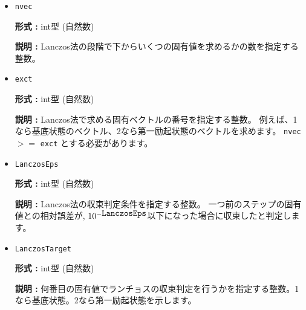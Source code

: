 \begin{itemize}
{\bf 形式 :} int型 (整数)

{\bf 説明 :} 
\begin{itemize}
\item{ランチョス法}
\begin{itemize}
\item{カノニカル集団かつ \verb|initial_iv| $\geq 0$の場合}

ノンゼロの成分が指定されます。

\item{ \verb|initial_iv| $< 0$の場合}

乱数のシードが指定され、全ての成分に対して係数がランダムに与えられます。なお、グランドカノニカルの場合は初期状態として多くの状態を持つよう、こちらの様式が適用されます。
\end{itemize}

\item{TPQ法}

乱数のシードが指定され、全ての成分に対して係数がランダムに与えられます。
\end{itemize}
初期ベクトル設定の詳細については、\ref{Ch:algorithm}を参照ください。
 
 \item  \verb|nvec|

{\bf 形式 :} int型 (自然数)

{\bf 説明 :} Lanczos法の段階で下からいくつの固有値を求めるかの数を指定する整数。

 \item  \verb|exct|

{\bf 形式 :} int型 (自然数)

{\bf 説明 :} Lanczos法で求める固有ベクトルの番号を指定する整数。
例えば、1なら基底状態のベクトル、2なら第一励起状態のベクトルを求めます。
   \verb|nvec| $>=$ \verb|exct| とする必要があります。

\item   \verb|LanczosEps|
   
{\bf 形式 :} int型 (自然数)

{\bf 説明 :} Lanczos法の収束判定条件を指定する整数。
一つ前のステップの固有値との相対誤差が, $10^{- \verb|LanczosEps|}$以下になった場合に収束したと判定します。

 \item  \verb|LanczosTarget| 
   
 {\bf 形式 :} int型 (自然数)

  {\bf 説明 :} 何番目の固有値でランチョスの収束判定を行うかを指定する整数。1なら基底状態。2なら第一励起状態を示します。
     

\end{itemize}
